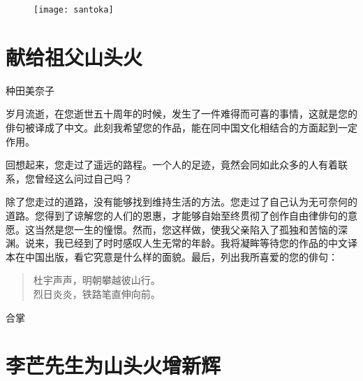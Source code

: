 
\begin{figure}
    \texttt{[image: santoka]}
\end{figure}

\chapter{\FK 献给祖父山头火}

 {\FS

  \hfill 种田美奈子\footnotemark[1]

  \bigskip

  岁月流逝，在您逝世五十周年的时候，发生了一件难得而可喜的事情，这就是您的俳句被译成了中文。此刻我希望您的作品，能在同中国文化相结合的方面起到一定作用。

  回想起来，您走过了遥远的路程。一个人的足迹，竟然会同如此众多的人有着联系，您曾经这么问过自己吗？

  除了您走过的道路，没有能够找到维持生活的方法。您走过了自己认为无可奈何的道路。您得到了谅解您的人们的恩惠，才能够自始至终贯彻了创作自由律俳句\footnotemark[2] 的意愿。这当然是您一生的憧憬。然而，您这样做，使我父亲陷入了孤独和苦恼的深渊\footnotemark[3]。说来，我已经到了时时感叹人生无常的年龄。我将凝眸等待您的作品的中文译本在中国出版，看它究意是什么样的面貌。最后，列出我所喜爱的您的俳句：

  \begin{quote}
      杜宇声声，明朝攀越彼山行。\\
      烈日炎炎，铁路笔直伸向前。
  \end{quote}

  \hfill 合掌

 }

\chapter{\FK 李芒先生为山头火增新辉}

